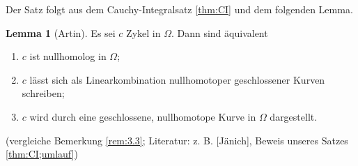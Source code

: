 \documentclass[11pt,titlepage]{article}
\theoremstyle{definition}
\newtheorem{lemma}[theorem]{Lemma}
\theoremstyle{remark}
\begin{document}
	Der Satz folgt aus dem Cauchy-Integralsatz \ref{thm:CI} und dem folgenden Lemma.
	
	\begin{lemma}[Artin]
		Es sei $c$ Zykel in $\Omega$. Dann sind äquivalent
		\begin{enumerate}
			\item $c$ ist nullhomolog in $\Omega$; \label{artin1}
			\item $c$ lässt sich als Linearkombination nullhomotoper geschlossener Kurven schreiben; 
			\label{artin2}
			\item $c$ wird durch eine geschlossene, nullhomotope Kurve in $\Omega$ dargestellt. 
			\label{artin3}
		\end{enumerate}
		(vergleiche Bemerkung \ref{rem:3.3}; Literatur: z. B. [Jänich], Beweis unseres Satzes 
		\ref{thm:CI;umlauf})
	\end{lemma}
	
\end{document}
